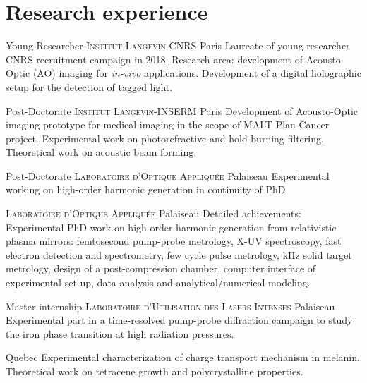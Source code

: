 \documentclass[11pt,a4paper,sans]{moderncv} %
\begin{document}

\section{Research experience}

{Young-Researcher}
{\textsc{Institut Langevin-CNRS}}
{Paris}
{}
{Laureate of young researcher CNRS recruitment campaign in 2018. Research area: development of  Acousto-Optic (AO) imaging for \textit{in-vivo} applications. Development of a digital holographic setup for the detection of tagged light.}


{Post-Doctorate}
{\textsc{Institut Langevin-INSERM}}
{Paris}
{}
{Development of Acousto-Optic imaging prototype for medical imaging in the scope of MALT Plan Cancer project. Experimental work on photorefractive and hold-burning filtering. Theoretical work on acoustic beam forming.}

{Post-Doctorate}
{\textsc{Laboratoire d'Optique Appliquée}}
{Palaiseau}
{}
{Experimental working on high-order harmonic generation in continuity of PhD}

{%
\textsc{Laboratoire d'Optique Appliquée}}
{%
Palaiseau}
{}
{%
Detailed achievements:
Experimental PhD work on high-order harmonic generation from relativistic plasma mirrors: femtosecond pump-probe metrology, X-UV spectroscopy, fast electron detection and spectrometry, few cycle pulse metrology, kHz solid target metrology, design of a post-compression chamber, computer interface of experimental set-up, data analysis and analytical/numerical modeling. 
}


{Master internship}
{\textsc{Laboratoire d'Utilisation des Lasers Intenses}}
{Palaiseau}
{}
{Experimental part in a time-resolved pump-probe diffraction campaign to study the iron phase transition at high radiation pressures. }




{Quebec}
{}
{Experimental characterization of charge transport mechanism in melanin. Theoretical work on tetracene growth and polycrystalline properties.}
\end{document}
